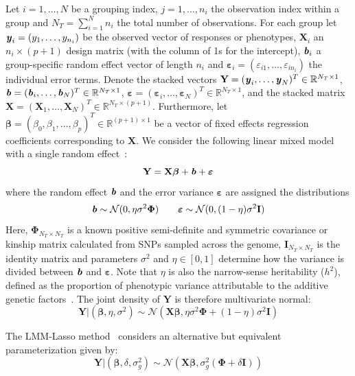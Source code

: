 \documentclass[12pt,letter]{article}\usepackage[]{graphicx}\usepackage[]{color}
\newcommand{\by}{\textbf{\emph{y}}}
\newcommand{\bX}{\textbf{X}}
\newcommand{\bY}{\textbf{Y}}
\newcommand{\bb}{\textbf{\emph{b}}}
\newcommand{\bI}{\textbf{I}}
\newcommand{\be}{\boldsymbol{\varepsilon}}
\newcommand{\bbeta}{\boldsymbol{\beta}}
\newcommand{\bPhi}{\boldsymbol{\Phi}}
\begin{document}
Let $i = 1, \ldots, N$ be a grouping index, $j = 1, \ldots, n_i$ the observation index within a group and $N_T = \sum_{i=1}^{N} n_i$ the total number of observations. For each group let \mbox{$\by_i = (y_1, \ldots, y_{n_i})$} be the observed vector of responses or phenotypes, $\bX_i$ an $n_i \times (p + 1)$ design matrix (with the column of 1s for the intercept), $\bb_i$ a group-specific random effect vector of length $n_i$ and \mbox{$\be_i = (\varepsilon_{i1}, \ldots, \varepsilon_{in_i})$} the individual error terms. Denote the stacked vectors $\bY = (\by_i, \ldots, \by_N)^T \in \mathbb{R}^{N_T \times 1}$, $\bb = (\bb_i, \ldots, \bb_N)^T \in \mathbb{R}^{N_T \times 1}$, \mbox{$\be = (\be_i, \ldots, \be_N)^T \in \mathbb{R}^{N_T \times 1}$}, and the stacked matrix \\\mbox{$\bX = (\bX_1, \ldots, \bX_N)^T \in \mathbb{R}^{N_T \times (p + 1)}$}. Furthermore, let $\bbeta = (\beta_0,\beta_1, \ldots, \beta_p)^T \in \mathbb{R}^{(p+1) \times 1}$ be a vector of fixed effects regression coefficients corresponding to $\bX$. We consider the following linear mixed model with a single random effect~\citep{pirinen2013efficient}:
\begin{equation}
	\bY = \bX \bbeta + \bb + \be
\end{equation}
where the random effect $\bb$ and the error variance $\be$ are assigned the distributions
\begin{equation}
	\bb \sim \mathcal{N}(0, \eta \sigma^2 \bPhi) \qquad \be \sim \mathcal{N}(0, (1-\eta)\sigma^2 \bI)
\end{equation}
Here, $\bPhi_{N_T \times N_T}$ is a known positive semi-definite and symmetric covariance or kinship matrix calculated from SNPs sampled across the genome,   $\bI_{N_T \times N_T}$ is the identity matrix and parameters $\sigma^2$ and $\eta \in [0,1]$ determine how the variance is divided between $\bb$ and $\be$. Note that $\eta$ is also the narrow-sense heritability ($h^2$), defined as the proportion of phenotypic variance attributable to the additive genetic factors~\citep{manolio2009finding}. The joint density of $\bY$ is therefore multivariate normal:
\begin{equation}
	\bY | (\bbeta, \eta, \sigma^2) \sim \mathcal{N}(\bX \bbeta, \eta \sigma^2 \bPhi + (1-\eta)\sigma^2 \bI) \label{eq:prinen}
\end{equation}

The LMM-Lasso method~\citep{rakitsch2013lasso} considers an alternative but equivalent parameterization given by:
\begin{equation}
	\bY | (\bbeta, \delta, \sigma_g^2) \sim \mathcal{N}(\bX \bbeta, \sigma_g^2(\bPhi + \delta\bI)) \label{eq:lippert}
\end{equation}
\end{document}
